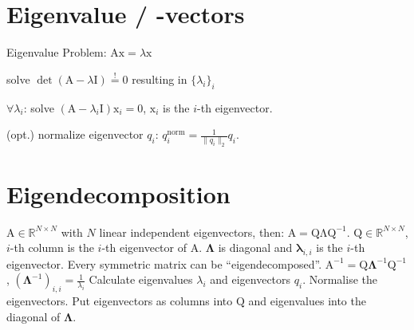 \documentclass[a4paper, 11pt, landscape]{article}
\newcommand{\matr}[1]{\boldsymbol{\mathrm{#1}}}
\begin{document}
\begin{multicols*}{3}
\section{Eigenvalue / -vectors}
Eigenvalue Problem: $\matr{Ax} = \lambda \matr{x}$
\begin{compactenum}
	\item solve $\operatorname{det}(\matr{A} - \lambda \matr{I}) \overset{!}{=} 0$ resulting in $\{\lambda_i\}_i$
	\item $\forall \lambda_i$:
		solve $(\matr{A} - \lambda_i \matr{I}) \matr{x}_i = \matr{0}$, $\matr{x}_i$ is the $i$-th eigenvector.
	\item (opt.) normalize eigenvector $q_i$: $q_i^{\text{norm}} = \frac{1}{\|q_i\|_2} q_i$.
\end{compactenum}

\section{Eigendecomposition}
$\matr{A} \in \mathbb{R}^{N \times N}$ with $N$ linear independent eigenvectors, then: $\matr{A} = \matr{Q \Lambda Q}^{-1}$. $\matr{Q} \in \mathbb{R}^{N \times N}$, $i$-th column is the $i$-th eigenvector of $\matr{A}$. $\boldsymbol{\Lambda}$ is diagonal and $\boldsymbol{\lambda}_{i,i}$ is the $i$-th eigenvector. Every symmetric matrix can be ``eigendecomposed''. 
$\matr{A}^{-1} = \matr{Q} \boldsymbol{\Lambda}^{-1} \matr{Q}^{-1}$, $(\boldsymbol{\Lambda}^{-1})_{i,i} = \frac{1}{\lambda_i}$
Calculate eigenvalues $\lambda_i$ and eigenvectors $q_i$. Normalise the eigenvectors. Put eigenvectors as columns into $\matr{Q}$ and eigenvalues into the diagonal of $\boldsymbol{\Lambda}$.


\end{multicols*}
\end{document}
